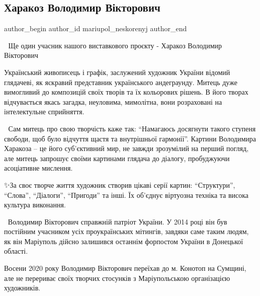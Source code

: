  
 
 
 
 

\subsection{Харакоз Володимир Вікторович}
\label{sec:01_09_2023.fb.mariupol_neskorenyj.1.harakoz_volodymyr_viktorovych}

\ifcmt
 author_begin
   author_id mariupol_neskorenyj
 author_end
\fi

📎 Ще один учасник нашого виставкового проєкту - Харакоз Володимир Вікторович

Український живописець і графік, заслужений художник України відомий глядачеві,
як яскравий представник українського андеграунду.  Митець дуже вимогливий до
композицій своїх творів та їх кольорових рішень. В  його творах відчувається
якась загадка, неуловима, мимолітна, вони розраховані на  інтелектульне
сприйняття.

🎨 Сам митець про свою творчість каже так: \enquote{Намагаюсь досягнути такого ступеня
свободи, щоб було відчуття щастя та внутрішньої гармонії}. Картини Володимира
Харакоза – це його суб'єктивний мир, не завжди зрозумілий на перший погляд,
але митець запрошує своїми картинами глядача до діалогу, пробуджуючи
асоціативне мислення.

✨️За своє творче життя художник створив цікаві серії картин:
\enquote{Структури}, \enquote{Слова}, \enquote{Діалоги}, \enquote{Пригоди} та
інші. Їх об'єднує віртуозна техніка та висока культура виконання.

💙💛Володимир Вікторович справжній патріот України. У 2014 році він був
постійним учасником усіх проукраїнських мітингів, завдяки саме таким людям, як
він Маріуполь дійсно залишився останнім форпостом України в Донецької області.

Восени 2020 року Володимир Вікторович переїхав  до м. Конотоп на Сумщині, але
не перериває своїх творчих стосунків з Маріупольською організацією художників.

